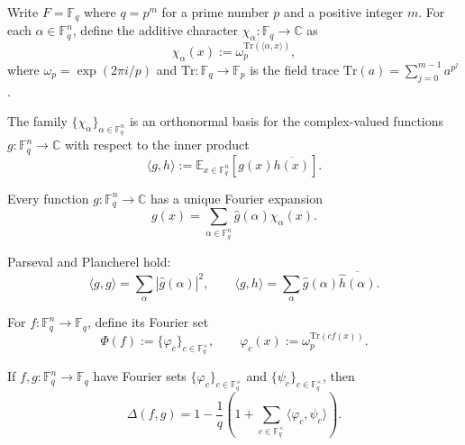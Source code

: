 \begin{definition}
    \label{def:ff-additive-characters}
    Write $F=\mathbb{F}_q$ where $q = p^m$ for a prime number $p$ and a positive integer $m$. For each $\alpha \in \mathbb{F}_q^n$, define
  the additive character $\chi_\alpha : \mathbb{F}_q \rightarrow \mathbb{C}$ as
  \[
    \chi_\alpha(x) := \omega_p^{\mathrm{Tr}(\langle \alpha, x\rangle)},
  \]
  where $ \omega_p = \exp(2π i/p)$ and  $\mathrm{Tr} : \mathbb{F}_q \to \mathbb{F}_p $ is the field trace $\mathrm{Tr}(a) = \sum_{j=0}^{m-1} a^{p^j}$.
\end{definition}

\begin{lemma}
    \label{lem:ff-characters-orthonormal}
The family $\{\chi_\alpha\}_{\alpha \in \mathbb{F}_q^n}$ is an
  orthonormal basis for the complex-valued functions
  $g : \mathbb{F}_q^n \to \mathbb{C}$ with respect to the inner product
  \[
    \langle g,h\rangle := \mathbb{E}_{x \in \mathbb{F}_q^n}[g(x)\overline{h(x)}].
  \]
\end{lemma}

\begin{lemma}
    \label{lem:ff-fourier-expansion}
Every function $g : \mathbb{F}_q^n \to \mathbb{C}$ has a unique
  Fourier expansion
  \[
    g(x) = \sum_{\alpha \in \mathbb{F}_q^n} \widehat g(\alpha)\chi_\alpha(x).
  \]
\end{lemma}

\begin{lemma}
    \label{lem:ff-parseval-plancherel}
    Parseval and Plancherel hold:
  \[
    \langle g,g\rangle = \sum_\alpha |\widehat g(\alpha)|^2,
    \qquad
    \langle g,h\rangle = \sum_\alpha \widehat g(\alpha)\overline{\widehat h(\alpha)}.
  \]
\end{lemma}

\begin{definition}
    \label{def:ff-fourier-set}
    For $f : \mathbb{F}_q^n \to \mathbb{F}_q$, define its Fourier set
  \[
    \Phi(f) := \{\varphi_c\}_{c \in \mathbb{F}_q^\times},
    \qquad
    \varphi_c(x) := \omega_p^{\mathrm{Tr}(c f(x))}.
  \]
\end{definition}

\begin{lemma}
    \label{lem:ff-distance-formula}
If $f,g : \mathbb{F}_q^n \to \mathbb{F}_q$ have Fourier sets
  $\{\varphi_c\}_{c \in \mathbb{F}_q^\times}$ and
  $\{\psi_c\}_{c \in \mathbb{F}_q^\times}$, then
  \[
    \Delta(f,g)
    = 1 - \frac{1}{q}\left(1 + \sum_{c \in \mathbb{F}_q^\times}
      \langle \varphi_c,\psi_c\rangle\right).
  \]
\end{lemma}

